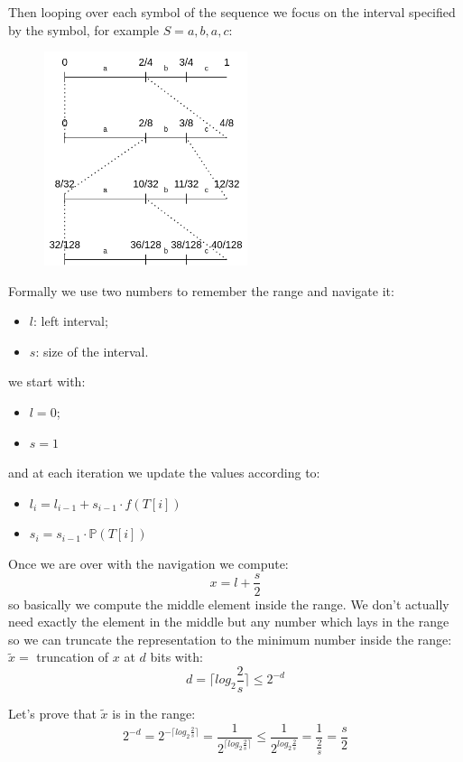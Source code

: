Then looping over each symbol of the sequence we focus on the interval specified by the symbol, for example $S = a, b, a, c$:
\begin{figure}[H]
    \centering
    \includegraphics[width=225px]{images/10_Data_compression/arithmetic_encoding_1.png}
\end{figure}

Formally we use two numbers to remember the range and navigate it:
\begin{itemize}
    \item $l$: left interval;
    \item $s$: size of the interval.
\end{itemize}
we start with:
\begin{itemize}
    \item $l=0$;
    \item $s=1$
\end{itemize}
and at each iteration we update the values according to:
\begin{itemize}
    \item $l_i = l_{i-1} + s_{i-1} \cdot f(T[i]) $
    \item $s_i = s_{i-1} \cdot \mathbb{P}(T[i])$
\end{itemize}

Once we are over with the navigation we compute:
$$
    x = l + \frac{s}{2}
$$
so basically we compute the middle element inside the range.
We don't actually need exactly the element in the middle but any number which lays in the range so we can truncate the representation to the minimum number inside the range: $\tilde{x} = $ truncation of $x$ at $d$ bits with:
$$
    d = \lceil log_2 \frac{2}{s} \rceil \leq 2^{-d}
$$

Let's prove that $\tilde{x}$ is in the range:
$$
    2^{-d} = 2 ^{-\lceil log_2 \frac{2}{s} \rceil} = \frac{1}{ 2 ^{\lceil log_2 \frac{2}{s} \rceil} } \leq \frac{1}{ 2 ^{log_2 \frac{2}{s}} } = \frac{1}{\frac{2}{s}} = \frac{s}{2}
$$

